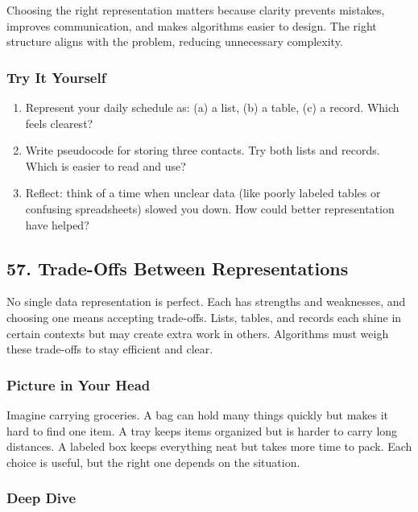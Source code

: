 \documentclass[
  letterpaper,
  DIV=11,
  numbers=noendperiod]{scrreprt}
\providecommand{\tightlist}{%
  \setlength{\itemsep}{0pt}\setlength{\parskip}{0pt}}
\begin{document}
Choosing the right representation matters because clarity prevents
mistakes, improves communication, and makes algorithms easier to design.
The right structure aligns with the problem, reducing unnecessary
complexity.

\subsubsection{Try It Yourself}\label{try-it-yourself-55}

\begin{enumerate}
\def\labelenumi{\arabic{enumi}.}
\tightlist
\item
  Represent your daily schedule as: (a) a list, (b) a table, (c) a
  record. Which feels clearest?
\item
  Write pseudocode for storing three contacts. Try both lists and
  records. Which is easier to read and use?
\item
  Reflect: think of a time when unclear data (like poorly labeled tables
  or confusing spreadsheets) slowed you down. How could better
  representation have helped?
\end{enumerate}

\subsection{57. Trade-Offs Between
Representations}\label{trade-offs-between-representations}

No single data representation is perfect. Each has strengths and
weaknesses, and choosing one means accepting trade-offs. Lists, tables,
and records each shine in certain contexts but may create extra work in
others. Algorithms must weigh these trade-offs to stay efficient and
clear.

\subsubsection{Picture in Your Head}\label{picture-in-your-head-56}

Imagine carrying groceries. A bag can hold many things quickly but makes
it hard to find one item. A tray keeps items organized but is harder to
carry long distances. A labeled box keeps everything neat but takes more
time to pack. Each choice is useful, but the right one depends on the
situation.

\subsubsection{Deep Dive}\label{deep-dive-26}
\end{document}

